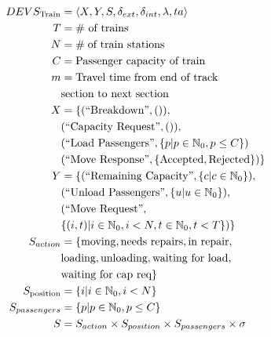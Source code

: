 \newcommand{\InBreakDown}[0]{(\text{``Breakdown''}, ())}
\newcommand{\InCapReq}[0]{(\text{``Capacity Request''}, ())}
\newcommand{\InMoveRes}[1]{(\text{``Move Response''}, #1)}
\newcommand{\InLoadPassengers}[1]{(\text{``Load Passengers''}, #1)}

\newcommand{\OutRemainingCapacity}[1]{(\text{``Remaining Capacity''}, #1)}
\newcommand{\OutUnloadPassengers}[1]{(\text{``Unload Passengers''}, #1)}
\newcommand{\OutMoveReq}[1]{(\text{``Move Request''}, #1)}
\newcommand{\phase}[0]{\text{phase}}

\newcommand{\Mod}[2]{\mathrm{mod} (#1, #2)}

\begin{align*}
DEVS_{\textrm{Train}} &= \left<X,Y,S,\delta_{ext},\delta_{int},\lambda,ta\right> \\
    T &= \text{\# of trains} \\
    N &= \# \text{\;of train stations} \\
    C &= \text{Passenger capacity of train} \\
    m &= \text{Travel time from end of track} \\
        & \text{section to next section} \\
    X &= \{
      \InBreakDown, \\
      &  \InCapReq, \\
      &  \InLoadPassengers{\{ p | p \in \mathbb{N}_0, p \leq C \}} \\
      &  \InMoveRes{\{ \text{Accepted}, \text{Rejected} \}}
    \} \\
    Y &= \{
      \OutRemainingCapacity{\{ c | c \in \mathbb{N}_0 \}}, \\
      &  \OutUnloadPassengers{\{ u | u \in \mathbb{N}_0 \}}, \\
      &  \OutMoveReq{\\ 
        & \{ (i, t) | i \in \mathbb{N}_0, i < N, t \in \mathbb{N}_0, t < T \}}
    \} \\
    S_{action} &= \{
      \text{moving}, \text{needs repairs}, \text{in repair}, \\
      &  \text{loading}, \text{unloading}, \text{waiting for load}, \\
      &  \text{waiting for cap req} 
    \} \\
    S_{\text{position}} &= \{ i | i \in \mathbb{N}_0, i < N
    \} \\
    S_{passengers} &= \{ p | p \in \mathbb{N}_0, p \leq C \} \\
    S &= S_{action} \times S_{position} \times S_{passengers} \times \sigma \\

\end{align*}
